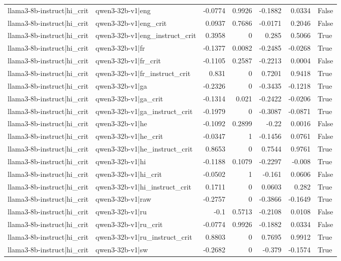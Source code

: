 \begin{table}
\begin{tabular}{l l r r r r l}
llama3-8b-instruct|hi_crit & qwen3-32b-v1|eng & -0.0774 & 0.9926 & -0.1882 & 0.0334 & False \\
llama3-8b-instruct|hi_crit & qwen3-32b-v1|eng_crit & 0.0937 & 0.7686 & -0.0171 & 0.2046 & False \\
llama3-8b-instruct|hi_crit & qwen3-32b-v1|eng_instruct_crit & 0.3958 & 0 & 0.285 & 0.5066 & True \\
llama3-8b-instruct|hi_crit & qwen3-32b-v1|fr & -0.1377 & 0.0082 & -0.2485 & -0.0268 & True \\
llama3-8b-instruct|hi_crit & qwen3-32b-v1|fr_crit & -0.1105 & 0.2587 & -0.2213 & 0.0004 & False \\
llama3-8b-instruct|hi_crit & qwen3-32b-v1|fr_instruct_crit & 0.831 & 0 & 0.7201 & 0.9418 & True \\
llama3-8b-instruct|hi_crit & qwen3-32b-v1|ga & -0.2326 & 0 & -0.3435 & -0.1218 & True \\
llama3-8b-instruct|hi_crit & qwen3-32b-v1|ga_crit & -0.1314 & 0.021 & -0.2422 & -0.0206 & True \\
llama3-8b-instruct|hi_crit & qwen3-32b-v1|ga_instruct_crit & -0.1979 & 0 & -0.3087 & -0.0871 & True \\
llama3-8b-instruct|hi_crit & qwen3-32b-v1|he & -0.1092 & 0.2899 & -0.22 & 0.0016 & False \\
llama3-8b-instruct|hi_crit & qwen3-32b-v1|he_crit & -0.0347 & 1 & -0.1456 & 0.0761 & False \\
llama3-8b-instruct|hi_crit & qwen3-32b-v1|he_instruct_crit & 0.8653 & 0 & 0.7544 & 0.9761 & True \\
llama3-8b-instruct|hi_crit & qwen3-32b-v1|hi & -0.1188 & 0.1079 & -0.2297 & -0.008 & True \\
llama3-8b-instruct|hi_crit & qwen3-32b-v1|hi_crit & -0.0502 & 1 & -0.161 & 0.0606 & False \\
llama3-8b-instruct|hi_crit & qwen3-32b-v1|hi_instruct_crit & 0.1711 & 0 & 0.0603 & 0.282 & True \\
llama3-8b-instruct|hi_crit & qwen3-32b-v1|raw & -0.2757 & 0 & -0.3866 & -0.1649 & True \\
llama3-8b-instruct|hi_crit & qwen3-32b-v1|ru & -0.1 & 0.5713 & -0.2108 & 0.0108 & False \\
llama3-8b-instruct|hi_crit & qwen3-32b-v1|ru_crit & -0.0774 & 0.9926 & -0.1882 & 0.0334 & False \\
llama3-8b-instruct|hi_crit & qwen3-32b-v1|ru_instruct_crit & 0.8803 & 0 & 0.7695 & 0.9912 & True \\
llama3-8b-instruct|hi_crit & qwen3-32b-v1|sw & -0.2682 & 0 & -0.379 & -0.1574 & True \\

\end{tabular}
\end{table}

